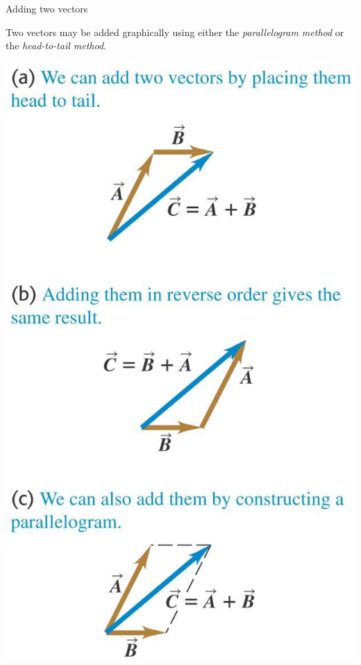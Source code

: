 \documentclass[18pt]{LectMechanics}
\begin{document}
\begin{frame}{Adding two vectors}{}
	\begin{center}
		Two vectors may be added graphically using either the \emph{parallelogram
			method} or the \emph{head-to-tail method}.
	\end{center}
	\begin{center}
		\begin{minipage}{.3\textwidth}
			\includegraphics[width=\linewidth]{Vector_Addition_1}

\end{minipage}
\end{center}
\end{frame}
\end{document}

